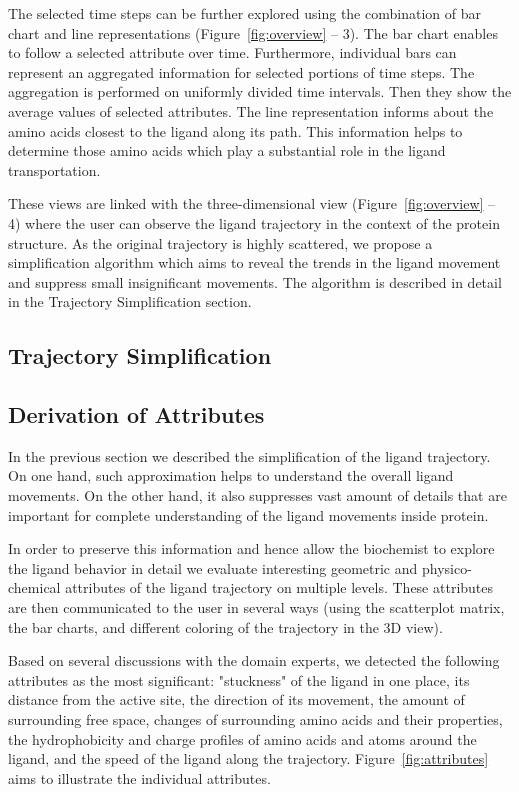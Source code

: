 \documentclass[twocolumn]{bmcart}%
\begin{document}
The selected time steps can be further explored using the combination of bar chart and line representations (Figure~\ref{fig:overview} -- 3). 
The bar chart enables to follow a selected attribute over time.
Furthermore, individual bars can represent an aggregated information for selected portions of time steps.
The aggregation is performed on uniformly divided time intervals.
Then they show the average values of selected attributes.
The line representation informs about the amino acids closest to the ligand along its path.
This information helps to determine those amino acids which play a substantial role in the ligand transportation.

These views are linked with the three-dimensional view (Figure~\ref{fig:overview} -- 4) where the user can observe the ligand trajectory in the context of the protein structure.
As the original trajectory is highly scattered, we propose a simplification algorithm which aims to reveal the trends in the ligand movement and suppress small insignificant movements.
The algorithm is described in detail in the Trajectory Simplification section.


\subsection*{Trajectory Simplification}


\subsection*{Derivation of Attributes}
In the previous section we described the simplification of the ligand trajectory. 
On one hand, such approximation helps to understand the overall ligand movements. 
On the other hand, it also suppresses vast amount of details that are important for complete understanding of the ligand movements inside protein.

In order to preserve this information and hence allow the biochemist to explore the ligand behavior in detail we evaluate interesting geometric and physico-chemical attributes of the ligand trajectory on multiple levels. 
These attributes are then communicated to the user in several ways (using the scatterplot matrix, the bar charts, and different coloring of the trajectory in the 3D view).

Based on several discussions with the domain experts, we detected the following attributes as the most significant: "stuckness" of the ligand in one place, its distance from the active site, the direction of its movement, the amount of surrounding free space, changes of surrounding amino acids and their properties, the hydrophobicity and charge profiles of amino acids and atoms around the ligand, and the speed of the ligand along the trajectory. 
Figure~\ref{fig:attributes} aims to illustrate the individual attributes.
\end{document}
